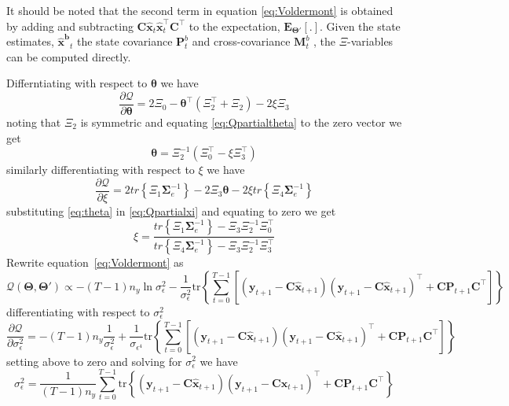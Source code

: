 \documentclass[]{article}
\begin{document}
It should be noted that the second term in equation \ref{eq:Voldermont} is obtained by adding and subtracting $\mathbf C \mathbf{\hat{x}}_t \mathbf{\hat{x}}_t^\top \mathbf C^\top$ to the expectation, $\mathbf E_{\boldsymbol\Theta'}\left[ .\right] $. Given the state estimates, $\mathbf {\hat x^{b}}_t$ the state covariance $\mathbf P_t^b$ and cross-covariance $\mathbf M_t^b$ , the $\Xi$-variables can be computed directly.

Differntiating with respect to $\boldsymbol\theta$ we have
\begin{equation}\label{eq:Qpartialtheta}
 \frac{\partial \mathcal Q}{\partial \boldsymbol\theta}=2\Xi_0-\boldsymbol\theta^\top(\Xi_2^\top+\Xi_2)-2\xi\Xi_3
\end{equation}
noting that $\Xi_2$ is symmetric and equating \ref{eq:Qpartialtheta} to the zero vector we get
\begin{equation}\label{eq:theta}
 \boldsymbol \theta=\Xi_2^{-1}\left(\Xi_0^\top-\xi\Xi_3^\top \right)
\end{equation}
similarly differentiating with respect to $\xi$ we have
\begin{equation}\label{eq:Qpartialxi}
 \frac{\partial \mathcal Q}{\partial \xi}=2tr\left\lbrace \Xi_1 \boldsymbol\Sigma_e^{-1}\right\rbrace -2 \Xi_3 \boldsymbol\theta - 2\xi tr \left\lbrace\Xi_4\boldsymbol\Sigma_e^{-1} \right\rbrace
\end{equation}
substituting \ref{eq:theta} in \ref{eq:Qpartialxi} and equating to zero we get
\begin{equation}
 \xi=\frac{tr\left\lbrace \Xi_1 \boldsymbol\Sigma_e^{-1}\right\rbrace-\Xi_3\Xi_2^{-1}\Xi_0^\top}{tr\left\lbrace \Xi_4 \boldsymbol\Sigma_e^{-1}\right\rbrace-\Xi_3\Xi_2^{-1}\Xi_3^\top}
\end{equation}
Rewrite equation~\ref{eq:Voldermont} as
\begin{equation}
 \mathcal Q(\boldsymbol \Theta,\boldsymbol\Theta')\propto-(T-1)n_y\ln\sigma^2_{\epsilon}-\frac{1}{\sigma_{\epsilon}^2}\mathrm{tr}\left\lbrace\sum_{t=0}^{T-1}\left[ (\mathbf y_{t+1}-\mathbf C\mathbf{\hat{x}}_{t+1}) (\mathbf y_{t+1}-\mathbf C\mathbf{\hat{x}}_{t+1})^\top+\mathbf C \mathbf P_{t+1}\mathbf C^\top\right] \right\rbrace
\end{equation}
differentiating with respect to $\sigma_{\epsilon}^2$
\begin{equation}
  \frac{\partial \mathcal Q}{\partial \sigma_{\epsilon}^2}=-(T-1)n_y\frac{1}{\sigma_{\epsilon}^2}+\frac{1}{\sigma_{\epsilon^4}}\mathrm{tr}\left\lbrace\sum_{t=0}^{T-1}\left[ (\mathbf y_{t+1}-\mathbf C\mathbf{\hat{x}}_{t+1}) (\mathbf y_{t+1}-\mathbf C\mathbf{\hat{x}}_{t+1})^\top+\mathbf C \mathbf P_{t+1}\mathbf C^\top\right] \right\rbrace
\end{equation}
setting above to zero and solving for $\sigma_{\epsilon}^2$ we have
\begin{equation}
 \sigma_{\epsilon}^2=\frac{1}{(T-1)n_y}\sum_{t=0}^{T-1}\mathrm{tr}\left\lbrace (\mathbf y_{t+1}-\mathbf C\mathbf{\hat{x}}_{t+1}) (\mathbf y_{t+1}-\mathbf C\mathbf{\hat{x}}_{t+1})^\top+\mathbf C \mathbf P_{t+1}\mathbf C^\top \right\rbrace
\end{equation}
\end{document}
